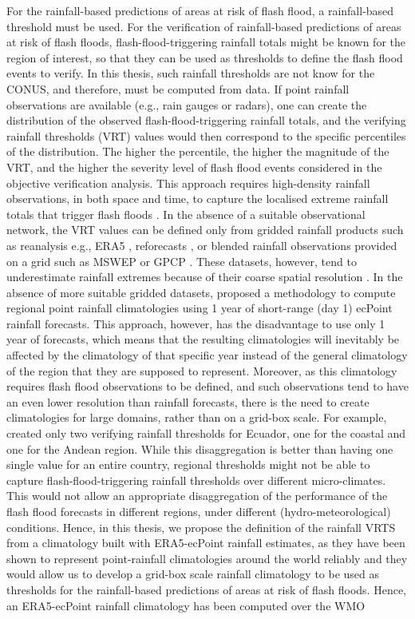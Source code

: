For the rainfall-based predictions of areas at risk of flash flood, a rainfall-based threshold must be used. For the verification of rainfall-based predictions of areas at risk of flash floods, flash-flood-triggering rainfall totals might be known for the region of interest, so that they can be used as thresholds to define the flash flood events to verify. In this thesis, such rainfall thresholds are not know for the CONUS, and therefore, must be computed from data. If point rainfall observations are available (e.g., rain gauges or radars), one can create the distribution of the observed flash-flood-triggering rainfall totals, and the verifying rainfall thresholds (VRT) values would then correspond to the specific percentiles of the distribution. The higher the percentile, the higher the magnitude of the VRT, and the higher the severity level of flash flood events considered in the objective verification analysis. This approach requires high-density rainfall observations, in both space and time, to capture the localised extreme rainfall totals that trigger flash floods \citep{Haiden_2016, RamosFilho_2021}. In the absence of a suitable observational network, the VRT values can be defined only from gridded rainfall products such as reanalysis e.g., ERA5 \citep{Hersbach_2020}, reforecasts \citep{Hamill_2006b}, or blended rainfall observations provided on a grid such as MSWEP \citep{Beck_2019} or GPCP \citep{Adler_2018}. These datasets, however, tend to underestimate rainfall extremes because of their coarse spatial resolution \citep{Tapiador_2019}. In the absence of more suitable gridded datasets, \citet{Pillosu_2024} proposed a methodology to compute regional point rainfall climatologies using 1 year of short-range (day 1) ecPoint rainfall forecasts. This approach, however, has the disadvantage to use only 1 year of forecasts, which means that the resulting climatologies will inevitably be affected by the climatology of that specific year instead of the general climatology of the region that they are supposed to represent. Moreover, as this climatology requires flash flood observations to be defined, and such observations tend to have an even lower resolution than rainfall forecasts, there is the need to create climatologies for large domains, rather than on a grid-box scale. For example, \citet{Pillosu_2024} created only two verifying rainfall thresholds for Ecuador, one for the coastal and one for the Andean region. While this disaggregation is better than having one single value for an entire country, regional thresholds might not be able to capture flash-flood-triggering rainfall thresholds over different micro-climates. This would not allow an appropriate disaggregation of the performance of the flash flood forecasts in different regions, under different (hydro-meteorological) conditions. Hence, in this thesis, we propose the definition of the rainfall VRTS from a climatology built with ERA5-ecPoint rainfall estimates, as they have been shown to represent point-rainfall climatologies around the world reliably \citep{Pillosu_2025a} and they would allow us to develop a grid-box scale rainfall climatology to be used as thresholds for the rainfall-based predictions of areas at risk of flash floods. Hence, an ERA5-ecPoint rainfall climatology has been computed over the WMO 